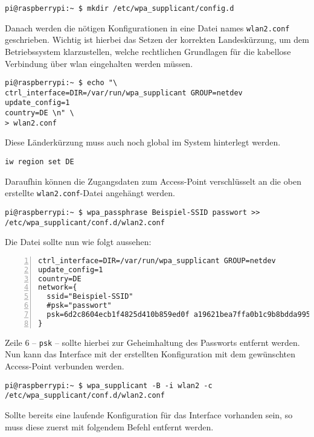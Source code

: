 \begin{lstlisting}
pi@raspberrypi:~ $ mkdir /etc/wpa_supplicant/config.d
\end{lstlisting}

\noindent Danach werden die nötigen Konfigurationen in eine Datei names \texttt{wlan2.conf} geschrieben.
Wichtig ist hierbei das Setzen der korrekten Landeskürzung, um dem Betriebssystem klarzustellen, welche rechtlichen Grundlagen
für die kabellose Verbindung über \gls{wlan} eingehalten werden müssen.

\begin{lstlisting}
pi@raspberrypi:~ $ echo "\
ctrl_interface=DIR=/var/run/wpa_supplicant GROUP=netdev
update_config=1
country=DE \n" \
> wlan2.conf
\end{lstlisting}

\noindent Diese Länderkürzung muss auch noch global im System hinterlegt werden.

\begin{lstlisting}
iw region set DE
\end{lstlisting}

\noindent Daraufhin können die Zugangsdaten zum Access-Point verschlüsselt an die oben erstellte \texttt{wlan2.conf}-Datei angehängt werden.

\begin{lstlisting}
pi@raspberrypi:~ $ wpa_passphrase Beispiel-SSID passwort >> /etc/wpa_supplicant/conf.d/wlan2.conf
\end{lstlisting}

\noindent Die Datei sollte nun wie folgt aussehen:

\begin{lstlisting}[numbers=left,xleftmargin=\dimexpr2.5em-1pt,framexleftmargin=2em]
ctrl_interface=DIR=/var/run/wpa_supplicant GROUP=netdev
update_config=1
country=DE
network={
  ssid="Beispiel-SSID"
  #psk="passwort"
  psk=6d2c8604ecb1f4825d410b859ed0f a19621bea7ffa0b1c9b8bdda995c7135c20
}
\end{lstlisting}

\noindent Zeile \num{6} -- \texttt{psk} -- sollte hierbei zur Geheimhaltung des Passworts entfernt werden.
Nun kann das Interface mit der erstellten Konfiguration mit dem gewünschten Access-Point verbunden werden.

\begin{lstlisting}
pi@raspberrypi:~ $ wpa_supplicant -B -i wlan2 -c /etc/wpa_supplicant/conf.d/wlan2.conf
\end{lstlisting}

\noindent Sollte bereits eine laufende Konfiguration für das Interface vorhanden sein, so muss diese zuerst mit folgendem
Befehl entfernt werden.

